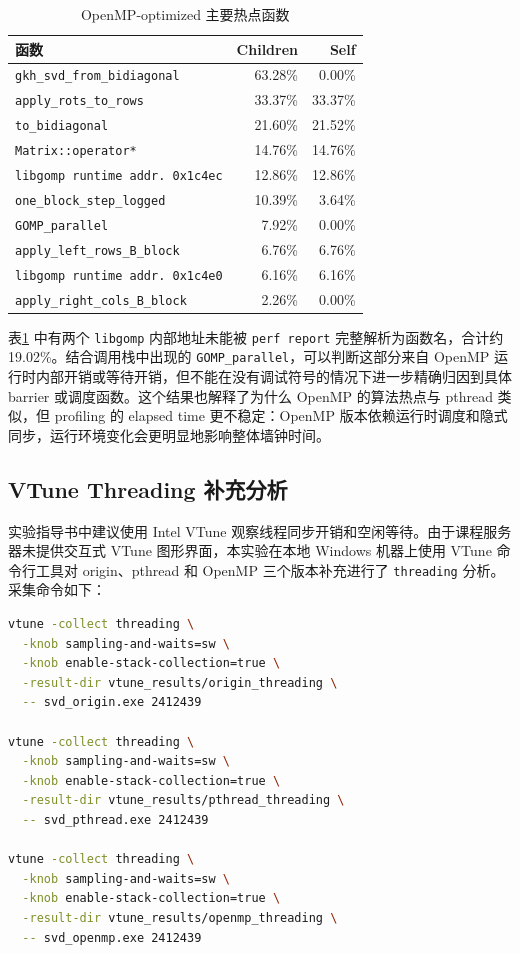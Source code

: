 ﻿\documentclass[UTF8,a4paper]{ctexart}
\begin{document}
\begin{table}[H]
\centering
\caption{OpenMP-optimized 主要热点函数}
\label{tab:perf_openmp_hotspot}
\begin{tabular}{lrr}
\toprule
函数 & Children & Self \\
\midrule
\texttt{gkh\_svd\_from\_bidiagonal} & 63.28\% & 0.00\% \\
\texttt{apply\_rots\_to\_rows} & 33.37\% & 33.37\% \\
\texttt{to\_bidiagonal} & 21.60\% & 21.52\% \\
\texttt{Matrix::operator*} & 14.76\% & 14.76\% \\
\texttt{libgomp runtime addr. 0x1c4ec} & 12.86\% & 12.86\% \\
\texttt{one\_block\_step\_logged} & 10.39\% & 3.64\% \\
\texttt{GOMP\_parallel} & 7.92\% & 0.00\% \\
\texttt{apply\_left\_rows\_B\_block} & 6.76\% & 6.76\% \\
\texttt{libgomp runtime addr. 0x1c4e0} & 6.16\% & 6.16\% \\
\texttt{apply\_right\_cols\_B\_block} & 2.26\% & 0.00\% \\
\bottomrule
\end{tabular}
\end{table}

表\ref{tab:perf_openmp_hotspot} 中有两个 \texttt{libgomp} 内部地址未能被 \texttt{perf report} 完整解析为函数名，合计约 19.02\%。结合调用栈中出现的 \texttt{GOMP\_parallel}，可以判断这部分来自 OpenMP 运行时内部开销或等待开销，但不能在没有调试符号的情况下进一步精确归因到具体 barrier 或调度函数。这个结果也解释了为什么 OpenMP 的算法热点与 pthread 类似，但 profiling 的 elapsed time 更不稳定：OpenMP 版本依赖运行时调度和隐式同步，运行环境变化会更明显地影响整体墙钟时间。

\subsection{VTune Threading 补充分析}

实验指导书中建议使用 Intel VTune 观察线程同步开销和空闲等待。由于课程服务器未提供交互式 VTune 图形界面，本实验在本地 Windows 机器上使用 VTune 命令行工具对 origin、pthread 和 OpenMP 三个版本补充进行了 \texttt{threading} 分析。采集命令如下：

\begin{lstlisting}[language=bash,caption={VTune threading 分析命令}]
vtune -collect threading \
  -knob sampling-and-waits=sw \
  -knob enable-stack-collection=true \
  -result-dir vtune_results/origin_threading \
  -- svd_origin.exe 2412439

vtune -collect threading \
  -knob sampling-and-waits=sw \
  -knob enable-stack-collection=true \
  -result-dir vtune_results/pthread_threading \
  -- svd_pthread.exe 2412439

vtune -collect threading \
  -knob sampling-and-waits=sw \
  -knob enable-stack-collection=true \
  -result-dir vtune_results/openmp_threading \
  -- svd_openmp.exe 2412439
\end{lstlisting}
\end{document}
